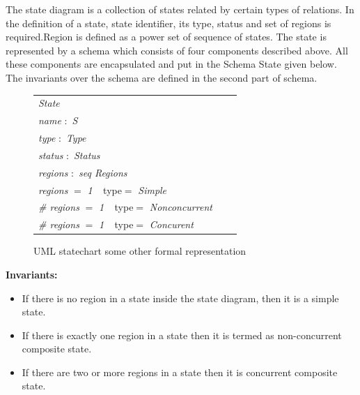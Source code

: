 The state diagram is a collection of states related by
certain types of relations. In the definition of a state, state identifier, its type, status and set of regions is required.Region is defined as a power set of sequence of states. The state is represented by a schema which consists of four components described above. All these components are
encapsulated and put in the Schema State given below.
The invariants over the schema are defined in the second
part of schema.\\

\begin{figure}[ht!]
	\centering
	\begin{tabular}{lll}
		\footnotesize                       
		\textit{State}       \\
		
		\footnotesize
		\textit{name}   $:$    \textit{S}  \\   
		\footnotesize
		\textit{type}   $:$    \textit{Type}  \\   
		\footnotesize
		\textit{status}   $:$    \textit{Status}      \\
		\footnotesize
		\textit{regions} $:$   \textit{seq Regions} \\
		
		\footnotesize
		\textit{regions} $=$   \textit{1} $\ \  $ {type}$=$   \textit{Simple} \\
		\footnotesize
		 \textit{\# regions} $=$   \textit{1} $\ \  $ {type}$=$   \textit{Nonconcurrent} \\
		 \textit{\# regions} $=$   \textit{1} $\ \  $ {type}$=$   \textit{Concurent} \\
		 
		
	\end{tabular}
	\caption{UML statechart some other formal representation}
	\label{statechart_formal_representation_part2}
\end{figure}

\textbf{Invariants:}
\begin{itemize}
\item  If there is no region in a state inside the state diagram, then it is a simple state.
\item  If there is exactly one region in a state then it is termed as non-concurrent composite state.
\item  If there are two or more regions in a state then it is
concurrent composite state.
\end{itemize}

